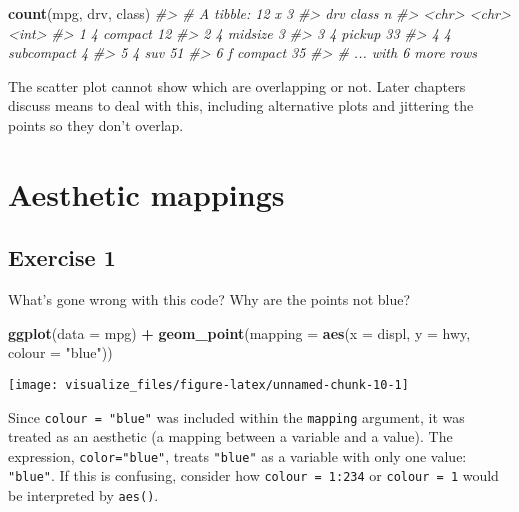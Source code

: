 \documentclass[]{book}
\newenvironment{Shaded}{\begin{snugshade}}{\end{snugshade}}
\newcommand{\CommentTok}[1]{\textcolor[rgb]{0.56,0.35,0.01}{\textit{#1}}}
\newcommand{\DataTypeTok}[1]{\textcolor[rgb]{0.13,0.29,0.53}{#1}}
\newcommand{\KeywordTok}[1]{\textcolor[rgb]{0.13,0.29,0.53}{\textbf{#1}}}
\newcommand{\NormalTok}[1]{#1}
\newcommand{\OperatorTok}[1]{\textcolor[rgb]{0.81,0.36,0.00}{\textbf{#1}}}
\newcommand{\StringTok}[1]{\textcolor[rgb]{0.31,0.60,0.02}{#1}}
\theoremstyle{plain}
\theoremstyle{remark}
\theoremstyle{definition}
\theoremstyle{definition}
\theoremstyle{definition}
\theoremstyle{remark}
\begin{document}
\begin{Shaded}
\begin{Highlighting}[]
\KeywordTok{count}\NormalTok{(mpg, drv, class)}
\CommentTok{#> # A tibble: 12 x 3}
\CommentTok{#>   drv   class          n}
\CommentTok{#>   <chr> <chr>      <int>}
\CommentTok{#> 1 4     compact       12}
\CommentTok{#> 2 4     midsize        3}
\CommentTok{#> 3 4     pickup        33}
\CommentTok{#> 4 4     subcompact     4}
\CommentTok{#> 5 4     suv           51}
\CommentTok{#> 6 f     compact       35}
\CommentTok{#> # ... with 6 more rows}
\end{Highlighting}
\end{Shaded}

The scatter plot cannot show which are overlapping or not. Later
chapters discuss means to deal with this, including alternative plots
and jittering the points so they don't overlap.

\hypertarget{aesthetic-mappings}{%
\section{Aesthetic mappings}\label{aesthetic-mappings}}

\hypertarget{exercise-1}{%
\subsection{Exercise 1}\label{exercise-1}}

What's gone wrong with this code? Why are the points not blue?

\begin{Shaded}
\begin{Highlighting}[]
\KeywordTok{ggplot}\NormalTok{(}\DataTypeTok{data =}\NormalTok{ mpg) }\OperatorTok{+}
\StringTok{  }\KeywordTok{geom_point}\NormalTok{(}\DataTypeTok{mapping =} \KeywordTok{aes}\NormalTok{(}\DataTypeTok{x =}\NormalTok{ displ, }\DataTypeTok{y =}\NormalTok{ hwy, }\DataTypeTok{colour =} \StringTok{"blue"}\NormalTok{))}
\end{Highlighting}
\end{Shaded}

\begin{center}\texttt{[image: visualize\_files/figure-latex/unnamed-chunk-10-1]} \end{center}

Since \texttt{colour\ =\ "blue"} was included within the
\texttt{mapping} argument, it was treated as an aesthetic (a mapping
between a variable and a value). The expression, \texttt{color="blue"},
treats \texttt{"blue"} as a variable with only one value:
\texttt{"blue"}. If this is confusing, consider how
\texttt{colour\ =\ 1:234} or \texttt{colour\ =\ 1} would be interpreted
by \texttt{aes()}.
\end{document}

